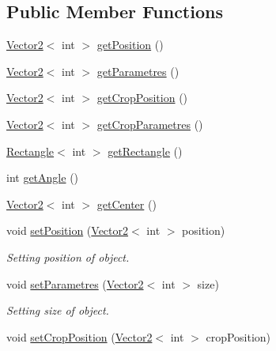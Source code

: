 \subsection*{Public Member Functions}
\begin{DoxyCompactItemize}
\item 
\hyperlink{struct_virtual_1_1_vector2}{Vector2}$<$ int $>$ \hyperlink{class_virtual_1_1_transformable_a2bb830f06c5123ae69d0584eef5f16f3}{get\+Position} ()
\item 
\hyperlink{struct_virtual_1_1_vector2}{Vector2}$<$ int $>$ \hyperlink{class_virtual_1_1_transformable_a816bf127c89675265776e94ef849e6e8}{get\+Parametres} ()
\item 
\hyperlink{struct_virtual_1_1_vector2}{Vector2}$<$ int $>$ \hyperlink{class_virtual_1_1_transformable_adbccc4539561975b0de4471d05ca7541}{get\+Crop\+Position} ()
\item 
\hyperlink{struct_virtual_1_1_vector2}{Vector2}$<$ int $>$ \hyperlink{class_virtual_1_1_transformable_a22aa918ae175dea89c27728a20c29f82}{get\+Crop\+Parametres} ()
\item 
\hyperlink{struct_virtual_1_1_rectangle}{Rectangle}$<$ int $>$ \hyperlink{class_virtual_1_1_transformable_aa25efa18322fe9eaa187cd7cb54909ae}{get\+Rectangle} ()
\item 
int \hyperlink{class_virtual_1_1_transformable_acda950f2b5d3f2b85aec5663bec79611}{get\+Angle} ()
\item 
\hyperlink{struct_virtual_1_1_vector2}{Vector2}$<$ int $>$ \hyperlink{class_virtual_1_1_transformable_a703da601d8ef871a03b0da591edda2fe}{get\+Center} ()
\item 
void \hyperlink{class_virtual_1_1_transformable_a2c1168cb1d892fbddd978c7d45dfcba9}{set\+Position} (\hyperlink{struct_virtual_1_1_vector2}{Vector2}$<$ int $>$ position)
\begin{DoxyCompactList}\small\item\em Setting position of object. \end{DoxyCompactList}\item 
void \hyperlink{class_virtual_1_1_transformable_a67d42e58b8f2fc45b565aa51e3f29f67}{set\+Parametres} (\hyperlink{struct_virtual_1_1_vector2}{Vector2}$<$ int $>$ size)
\begin{DoxyCompactList}\small\item\em Setting size of object. \end{DoxyCompactList}\item 
void \hyperlink{class_virtual_1_1_transformable_afa2e1b7971db9c916a38f7dfa06a0b26}{set\+Crop\+Position} (\hyperlink{struct_virtual_1_1_vector2}{Vector2}$<$ int $>$ crop\+Position)

\end{DoxyCompactItemize}
